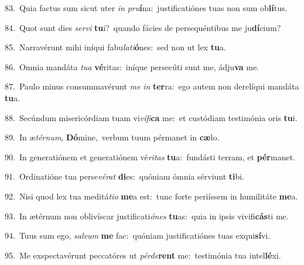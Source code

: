 {\numbfont\textcolor{\numbcolor}{83.}}~Quia factus sum sicut uter \textit{in} \textit{pru}\-\textbf{í}na:~\star justificatiónes tuas non sum ob\-\textbf{lí}\-tus.\par
{\numbfont\textcolor{\numbcolor}{84.}}~Quot sunt dies \textit{ser}\-\textit{vi} \textbf{tu}\-i?~\star quando fácies de persequéntibus me ju\-\textbf{dí}\-cium?\par
{\numbfont\textcolor{\numbcolor}{85.}}~Narravérunt mihi iníqui fabu\-\textit{la}\-\textit{ti}\textbf{ó}nes:~\star sed non ut lex \textbf{tu}\-a.\par
{\numbfont\textcolor{\numbcolor}{86.}}~Omnia mandáta \textit{tu}\-\textit{a} \textbf{vé}\-ritas:~\star iníque persecúti sunt me, ádju\textbf{va} me.\par
{\numbfont\textcolor{\numbcolor}{87.}}~Paulo minus consummavérunt \textit{me} \textit{in} \textbf{ter}\-ra:~\star ego autem non derelíqui mandáta \textbf{tu}\-a.\par
{\numbfont\textcolor{\numbcolor}{88.}}~Secúndum misericórdiam tuam vi\-\textit{ví}\-\textit{fi}\textbf{ca} me:~\star et custódiam testimónia oris \textbf{tu}\-i.\par
{\numbfont\textcolor{\numbcolor}{89.}}~In æ\-\textit{tér}\-\textit{num}, \textbf{Dó}\-mine,~\star verbum tuum pérmanet in \textbf{cæ}\-lo.\par
{\numbfont\textcolor{\numbcolor}{90.}}~In generatiónem et generatiónem vé\-\textit{ri}\-\textit{tas} \textbf{tu}\-a:~\star fundásti terram, et \textbf{pér}\-manet.\par
{\numbfont\textcolor{\numbcolor}{91.}}~Ordinatióne tua perse\-\textit{vé}\-\textit{rat} \textbf{di}\-es:~\star quóniam ómnia sérviunt \textbf{ti}\-bi.\par
{\numbfont\textcolor{\numbcolor}{92.}}~Nisi quod lex tua meditá\-\textit{ti}\-\textit{o} \textbf{me}\-a est:~\star tunc forte periíssem in humilitáte \textbf{me}\-a.\par
{\numbfont\textcolor{\numbcolor}{93.}}~In ætérnum non oblivíscar justificati\-\textit{ó}\-\textit{nes} \textbf{tu}\-as:~\star quia in ipsis vivifi\-\textbf{cás}\-ti me.\par
{\numbfont\textcolor{\numbcolor}{94.}}~Tuus sum ego, \textit{sal}\-\textit{vum} \textbf{me} fac:~\star quóniam justificatiónes tuas exqui\-\textbf{sí}\-vi.\par
{\numbfont\textcolor{\numbcolor}{95.}}~Me exspectavérunt peccatóres ut \textit{pér}\-\textit{de}\textbf{rent} me:~\star testimónia tua intel\-\textbf{lé}\-xi.\par
